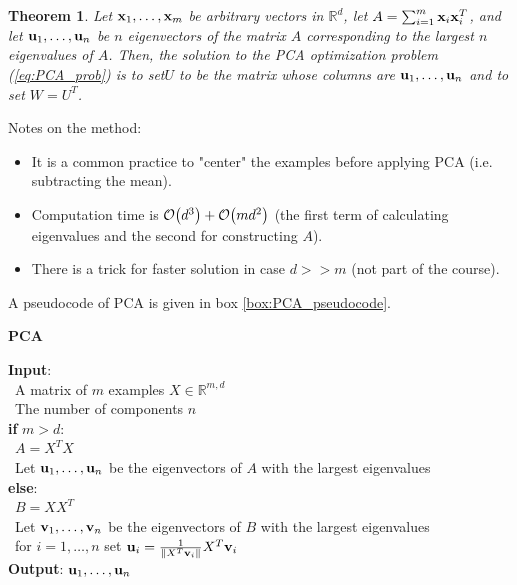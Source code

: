 \documentclass[12pt]{report}
\theoremstyle{plain}
\newtheorem{theorem}{Theorem}[chapter]
\begin{document}
\begin{flushleft}
\begin{theorem}
	Let $\vb{x}_1,\dots,\vb{x}_m$ be arbitrary vectors in $\mathds{R}^d$, let $A=\sum_{i=1}^m\vb{x}_i\vb{x}_i^T$, and let $\vb{u}_1,\dots,\vb{u}_n$ be $n$ eigenvectors of the matrix $A$ corresponding to the largest $n$ eigenvalues of $A$. Then, the solution to the PCA optimization problem (\ref{eq:PCA_prob}) is to set$U$ to be the matrix whose columns are $\vb{u}_1,\dots,\vb{u}_n$ and to set $W=U^T$.
\end{theorem}
Notes on the method:
\begin{itemize}
	\item It is a common practice to "center" the examples before applying PCA (i.e. subtracting the mean).
	\item Computation time is $\order{d^3} + \order{md^2}$ (the first term of calculating eigenvalues and the second for constructing $A$).
	\item There is a trick for faster solution in case $d>>m$ (not part of the course).
\end{itemize}

A pseudocode of PCA is given in box \ref{box:PCA_pseudocode}.
\begin{tcolorbox}
	\begin{center}
		\textbf{PCA}
	\end{center}
	\textbf{Input}:\\
	\-\ A matrix of $m$ examples $X\in\mathds{R}^{m,d}$\\
	\-\ The number of components $n$\\
	
	
	\textbf{if} $m>d$:\\
	\-\ $A=X^TX$\\
	\-\ Let $\vb{u}_1,\dots,\vb{u}_n$ be the eigenvectors of $A$ with the largest eigenvalues\\
	\textbf{else}:\\
	\-\ $B=XX^T$\\
	\-\ Let $\vb{v}_1,\dots,\vb{v}_n$ be the eigenvectors of $B$ with the largest eigenvalues\\
	\-\ for $i=1,\dots,n$ set $\vb{u}_i=\frac{1}{\norm{X^T\vb{v}_i}}X^T\vb{v}_i$\\
	
	\textbf{Output}: $\vb{u}_1,\dots,\vb{u}_n$\\
	
	\label{box:PCA_pseudocode}
\end{tcolorbox}


\end{flushleft}
\end{document}
